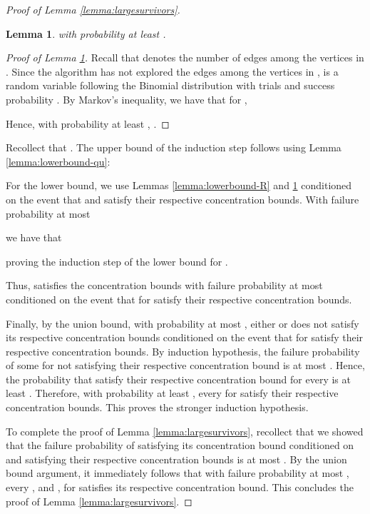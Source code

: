 \documentclass[11pt]{article}
\newtheorem{lemma}[theorem]{Lemma}
\begin{document}
\begin{proof}[Proof of Lemma \ref{lemma:largesurvivors}]
\begin{lemma}\label{lemma:upperbound-M}
 with probability at least .
\end{lemma}

\begin{proof}[Proof of Lemma \ref{lemma:upperbound-M}]
Recall that  denotes the number of edges among the vertices in . Since the algorithm has not explored the edges among the vertices in ,  is a random variable following the Binomial distribution with  trials and success probability . By Markov's inequality, we have that for ,

Hence,  with probability at least , .
\end{proof}

Recollect that . The upper bound of the induction step follows using Lemma \ref{lemma:lowerbound-qu}:


For the lower bound, we use Lemmas \ref{lemma:lowerbound-R} and \ref{lemma:upperbound-M} conditioned on the event that  and  satisfy their respective concentration bounds. With failure probability at most

we have that 


proving the induction step of the lower bound for .

Thus,  satisfies the concentration bounds with failure probability at most  conditioned on the event that  for  satisfy their respective concentration bounds.

Finally, by the union bound, with probability at most , either  or  does not satisfy its respective concentration bounds conditioned on the event that  for  satisfy their respective concentration bounds. By induction hypothesis, the failure probability of some  for  not satisfying their respective concentration bound is at most . Hence, the probability that   satisfy their respective concentration bound for every  is at least . Therefore, with probability at least , every  for  satisfy their respective concentration bounds. This proves the stronger induction hypothesis.

To complete the proof of Lemma \ref{lemma:largesurvivors}, recollect that we showed that the failure probability of  satisfying its concentration bound conditioned on  and  satisfying their respective concentration bounds is at most . By the union bound argument, it immediately follows that with failure probability at most , every ,  and , for  satisfies its respective concentration bound. This concludes the proof of Lemma \ref{lemma:largesurvivors}.
\end{proof}
\end{document}

